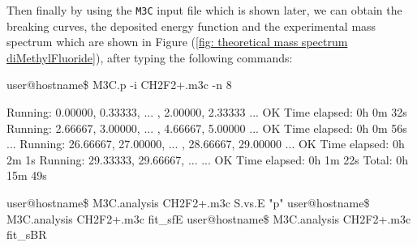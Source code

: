 \documentclass[a4paper,12pt]{article}
\begin{document}
Then finally by using the \texttt{M3C} input file which is shown later, we can obtain the breaking curves, the deposited energy function and the experimental mass 
spectrum which are shown in Figure (\ref{fig: theoretical mass spectrum diMethylFluoride}), after typing the following commands:

\begin{shellexec}
user@hostname\$ M3C.p -i CH2F2+.m3c -n 8

Running:    0.00000,   0.33333,  ... ,   2.00000,   2.33333 ... OK     Time elapsed: 0h  0m 32s
Running:    2.66667,   3.00000,  ... ,   4.66667,   5.00000 ... OK     Time elapsed: 0h  0m 56s
...
Running:   26.66667,  27.00000,  ... ,  28.66667,  29.00000 ... OK     Time elapsed: 0h  2m  1s
Running:   29.33333,  29.66667,  ...                        ... OK     Time elapsed: 0h  1m 22s
                                                                              Total: 0h 15m 49s
                                                                              
user@hostname\$ M3C.analysis CH2F2+.m3c S.vs.E "p"
user@hostname\$ M3C.analysis CH2F2+.m3c fit_sfE
user@hostname\$ M3C.analysis CH2F2+.m3c fit_sBR
\end{shellexec}


\end{document}
